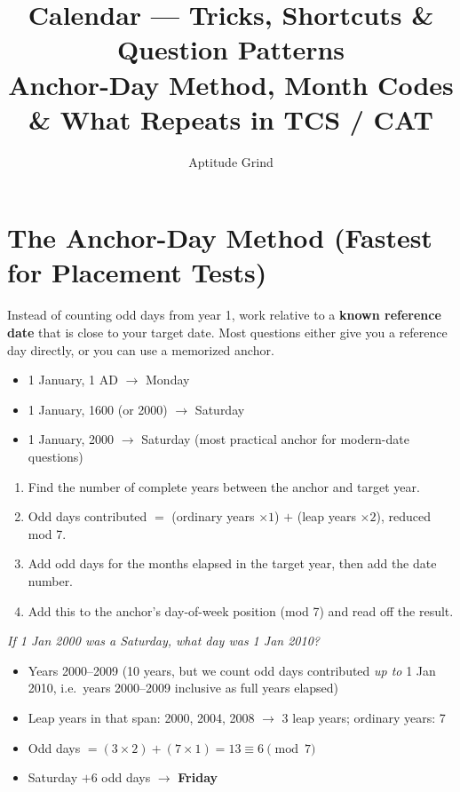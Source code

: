 \documentclass[11pt]{article}
\title{\color{primary}\textbf{Calendar --- Tricks, Shortcuts \& Question Patterns}\\[4pt]\large Anchor-Day Method, Month Codes \& What Repeats in TCS / CAT}
\author{Aptitude Grind}
\date{}
\begin{document}
\maketitle
\thispagestyle{fancy}

\section{The Anchor-Day Method (Fastest for Placement Tests)}

Instead of counting odd days from year 1, work relative to a \textbf{known reference date} that is
close to your target date. Most questions either give you a reference day directly, or you can use a
memorized anchor.

\begin{formulabox}
\begin{itemize}[leftmargin=1.4em]
  \item 1 January, 1 AD $\to$ Monday
  \item 1 January, 1600 (or 2000) $\to$ Saturday
  \item 1 January, 2000 $\to$ Saturday \quad (most practical anchor for modern-date questions)
\end{itemize}
\end{formulabox}

\begin{formulabox}
\begin{enumerate}[leftmargin=1.4em]
  \item Find the number of complete years between the anchor and target year.
  \item Odd days contributed $=$ (ordinary years $\times 1$) $+$ (leap years $\times 2$), reduced mod 7.
  \item Add odd days for the months elapsed in the target year, then add the date number.
  \item Add this to the anchor's day-of-week position (mod 7) and read off the result.
\end{enumerate}
\end{formulabox}

\begin{examplebox}
\textit{If 1 Jan 2000 was a Saturday, what day was 1 Jan 2010?}
\begin{itemize}[leftmargin=1.4em]
  \item Years 2000--2009 (10 years, but we count odd days contributed \emph{up to} 1 Jan 2010, i.e.\ years 2000--2009 inclusive as full years elapsed)
  \item Leap years in that span: 2000, 2004, 2008 $\to$ 3 leap years; ordinary years: 7
  \item Odd days $= (3 \times 2) + (7 \times 1) = 13 \equiv 6 \pmod 7$
  \item Saturday $+ 6$ odd days $\to$ \textbf{Friday}
\end{itemize}
\end{examplebox}
\end{document}
